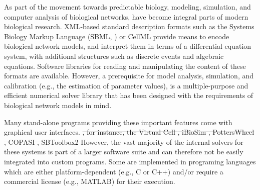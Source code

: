 \documentclass{bioinfo}
\begin{document}
As part of the movement towards predictable biology, modeling, 
simulation, and computer analysis of biological networks, have become integral
parts of modern biological research. XML-based standard description formats
such as the Systems Biology Markup Language (SBML, \citealt{Hucka2003}) or
CellML \citep{Lloyd2004} provide means to encode biological network models, and interpret them in terms of a differential equation system, with
additional structures such as discrete events and algebraic equations.
Software libraries for reading and manipulating the content of
these formats are available.
However, a prerequisite for model analysis, simulation, and calibration (e.g., the
estimation of parameter values), is a multiple-purpose and 
efficient numerical solver library that has been designed with the
requirements of biological network models in mind.

Many stand-alone programs providing these important features come with graphical user interfaces.
\sout{, for instance, the Virtual Cell \citep{Loew2001}, iBioSim \citep{Myers2009},
PottersWheel \citep{Maiwald2008}, COPASI \citep{Hoops2006}, SBToolbox2
\citep{SBT_Schmidt2006}}
However, the vast majority of the internal solvers for
these systems is part of a larger software suite and can therefore not
be easily integrated into custom programs. Some are implemented in programing
languages which are either platform-dependent (e.g., C or C++) and/or require
a commercial license (e.g., MATLAB\texttrademark{}) for their execution.
%
%
%
\end{document}
